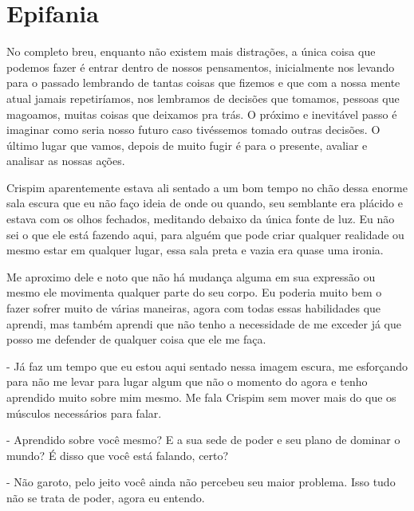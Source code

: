 
\chapter{Epifania}
    



No completo breu, enquanto não existem mais distrações, a única coisa que podemos fazer é entrar dentro de nossos pensamentos, inicialmente nos levando para o passado lembrando de tantas coisas que fizemos e que com a nossa mente atual jamais repetiríamos, nos lembramos de decisões que tomamos, pessoas que magoamos, muitas coisas que deixamos pra trás. O próximo e inevitável passo é imaginar como seria nosso futuro caso tivéssemos tomado outras decisões. O último lugar que vamos, depois de muito fugir é para o presente, avaliar e analisar as nossas ações.

Crispim aparentemente estava ali sentado a um bom tempo no chão dessa enorme sala escura que eu não faço ideia de onde ou quando, seu semblante era plácido e estava com os olhos fechados, meditando debaixo da única fonte de luz. Eu não sei o que ele está fazendo aqui, para alguém que pode criar qualquer realidade ou mesmo estar em qualquer lugar, essa sala preta e vazia era quase uma ironia.

Me aproximo dele e noto que não há mudança alguma em sua expressão ou mesmo ele movimenta qualquer parte do seu corpo. Eu poderia muito bem o fazer sofrer muito de várias maneiras, agora com todas essas habilidades que aprendi, mas também aprendi que não tenho a necessidade de me exceder já que posso me defender de qualquer coisa que ele me faça.

- Já faz um tempo que eu estou aqui sentado nessa imagem escura, me esforçando para não me levar para lugar algum que não o momento do agora e tenho aprendido muito sobre mim mesmo. Me fala Crispim sem mover mais do que os músculos necessários para falar.

- Aprendido sobre você mesmo? E a sua sede de poder e seu plano de dominar o mundo? É disso que você está falando, certo?

- Não garoto, pelo jeito você ainda não percebeu seu maior problema. Isso tudo não se trata de poder, agora eu entendo. 

